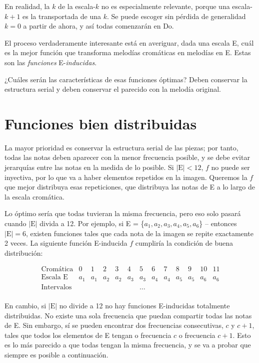 		En realidad, la $k$ de la escala-$k$ no es especialmente relevante, porque una escala-$k+1$ es la transportada de una $k$. Se puede escoger sin pérdida de generalidad $k=0$ a partir de ahora, y así todas comenzarán en Do.
		
		El proceso verdaderamente interesante está en averiguar, dada una escala E, cuál es la mejor función que transforma melodías cromáticas en melodías en E. Estas son las \textit{funciones} E-\textit{inducidas}.
		
		¿Cuáles serán las características de esas funciones óptimas? Deben conservar la estructura serial y deben conservar el parecido con la melodía original.
		
	\section{Funciones bien distribuidas}
		
		La mayor prioridad es conservar la estructura serial de las piezas; por tanto, todas las notas deben aparecer con la menor frecuencia posible, y se debe evitar jerarquías entre las notas en la medida de lo posible. Si $|\text{E}|<12$, $f$ no puede ser inyectiva, por lo que va a haber elementos repetidos en la imagen. Queremos la $f$ que mejor distribuya esas repeticiones, que distribuya las notas de E a lo largo de la escala cromática.
		
		Lo óptimo sería que todas tuvieran la misma frecuencia, pero eso solo pasará cuando $|\text{E}|$ divida a 12. Por ejemplo, si E = \{$a_1,a_2,a_3,a_4,a_5,a_6$\} -- entonces $|\text{E}|=6$, existen funciones tales que cada nota de la imagen se repite exactamente 2 veces. La siguiente función E-inducida $f$ cumpliría la condición de buena distribución:
				
		$$\left.\begin{matrix}
		\text{Cromática}&0&1&2&3&4&5&6&7&8&9&10&11\\
		\text{Escala E}&a_1&a_1&a_2&a_2&a_3&a_3&a_4&a_4&a_5&a_5&a_6&a_6\\
		\text{Intervalos}&&&&&&\ldots\\
		\end{matrix}\right.$$
		
		En cambio, si $|\text{E}|$ no divide a 12 no hay funciones E-inducidas totalmente distribuidas. No existe una sola frecuencia que puedan compartir todas las notas de E. Sin embargo, sí se pueden encontrar dos frecuencias consecutivas, $c$ y $c+1$, tales que todos los elementos de E tengan o frecuencia $c$ o frecuencia $c+1$. Esto es lo más parecido a que todas tengan la misma frecuencia, y se va a probar que siempre es posible a continuación. 
		
